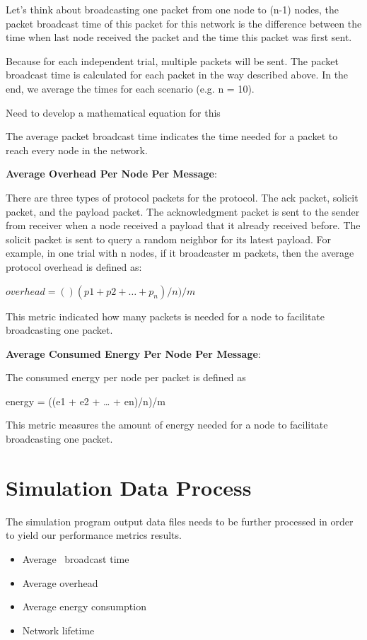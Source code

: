 Let's think about broadcasting one packet from one node to (n-1) nodes, the packet broadcast time of this packet for this network is the difference between the time when last node received the packet and the time this packet was first sent.

Because for each independent trial, multiple packets will be sent. The packet broadcast time is calculated for each packet in the way described above. In the end, we average the times for each scenario (e.g. n = 10). 

Need to develop a mathematical equation for this

The average packet broadcast time indicates the time needed for a packet to reach every node in the network.

\textbf{Average Overhead Per Node Per Message}:

There are three types of protocol packets for the protocol. The ack packet, solicit packet, and the payload packet. The acknowledgment packet is sent to the sender from receiver when a node received a payload that it already received before. The solicit packet is sent to query a random neighbor for its latest payload. For example, in one trial with n nodes, if it broadcaster m packets, then the average protocol overhead is defined as:

$overhead = ()(p1 + p2 + … + p_n) / n) / m$

This metric indicated how many packets is needed for a node to facilitate broadcasting one packet. 

\textbf{Average Consumed Energy Per Node Per Message}:

The consumed energy per node per packet is defined as

energy = ((e1 + e2 + … + en)/n)/m

This metric measures the amount of energy needed for a node to facilitate broadcasting one packet. 


\section{Simulation Data Process}
The simulation program output data files needs to be further processed in order to yield our performance metrics results. 

\begin{itemize}
	\item Average \msg ~broadcast time
	\item Average overhead
	\item Average energy consumption
	\item Network lifetime 
\end{itemize}

